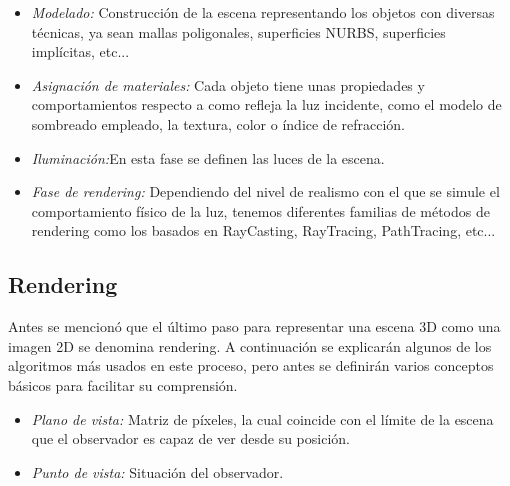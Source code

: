 \begin{itemize}
\item \emph{Modelado:} Construcción de la escena representando los objetos con diversas técnicas,
ya sean mallas poligonales, superficies NURBS, superficies implícitas, etc...
\item \emph{Asignación de materiales:} Cada objeto tiene unas propiedades y comportamientos respecto
a como refleja la luz incidente, como el modelo de sombreado empleado, la textura, color o índice de refracción.
\item\emph {Iluminación:}En esta fase se definen las luces de la escena.
\item\emph {Fase de rendering:} Dependiendo del nivel de realismo con el que se simule el comportamiento físico de la luz, tenemos diferentes familias de métodos de rendering como los basados en RayCasting, RayTracing, PathTracing, etc...
\end {itemize}


\subsection{Rendering}
\label{sec:rendering}

Antes se mencionó que el último paso para representar una escena 3D como una imagen 2D se denomina rendering. A continuación se explicarán algunos de los algoritmos más
usados en este proceso, pero antes se definirán varios conceptos básicos\cite{ground_up} para facilitar su comprensión.
\begin{itemize}
\item\emph{Plano de vista:} Matriz de píxeles, la cual coincide con el límite de la escena que el observador es capaz de ver desde su posición.
\item\emph{Punto de vista:} Situación del observador.
\end{itemize}

